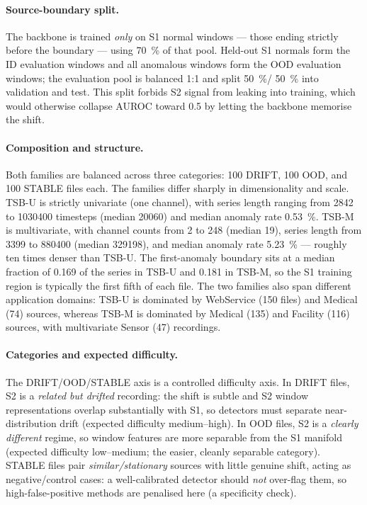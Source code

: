 \documentclass[11pt]{article}
\begin{document}
\paragraph{Source-boundary split.}
The backbone is trained \emph{only} on S1 normal windows --- those ending strictly
before the boundary --- using \SI{70}{\percent} of that pool. Held-out S1 normals
form the ID evaluation windows and all anomalous windows form the OOD evaluation
windows; the evaluation pool is balanced 1:1 and split \SI{50}{\percent}/%
\SI{50}{\percent} into validation and test. This split forbids S2 signal from
leaking into training, which would otherwise collapse AUROC toward \num{0.5} by
letting the backbone memorise the shift.

\paragraph{Composition and structure.}
Both families are balanced across three categories: \num{100} DRIFT, \num{100} OOD,
and \num{100} STABLE files each. The families differ sharply in dimensionality and
scale. TSB-U is strictly univariate (one channel), with series length ranging from
\num{2842} to \num{1030400} timesteps (median \num{20060}) and median anomaly rate
\SI{0.53}{\percent}. TSB-M is multivariate, with channel counts from \num{2} to
\num{248} (median \num{19}), series length from \num{3399} to \num{880400} (median
\num{329198}), and median anomaly rate \SI{5.23}{\percent} --- roughly ten times
denser than TSB-U. The first-anomaly boundary sits at a median fraction of
\num{0.169} of the series in TSB-U and \num{0.181} in TSB-M, so the S1 training
region is typically the first fifth of each file. The two families also span
different application domains: TSB-U is dominated by WebService (\num{150} files) and
Medical (\num{74}) sources, whereas TSB-M is dominated by Medical (\num{135}) and
Facility (\num{116}) sources, with multivariate Sensor (\num{47}) recordings.

\paragraph{Categories and expected difficulty.}
The DRIFT/OOD/STABLE axis is a controlled difficulty axis. In DRIFT files, S2 is a
\emph{related but drifted} recording: the shift is subtle and S2 window
representations overlap substantially with S1, so detectors must separate
near-distribution drift (expected difficulty medium--high). In OOD files, S2 is a
\emph{clearly different} regime, so window features are more separable from the S1
manifold (expected difficulty low--medium; the easier, cleanly separable category).
STABLE files pair \emph{similar/stationary} sources with little genuine shift, acting
as negative/control cases: a well-calibrated detector should \emph{not} over-flag
them, so high-false-positive methods are penalised here (a specificity check).
\end{document}
